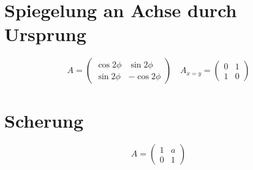 \documentclass{report}
\begin{document}
\section{Spiegelung an Achse durch Ursprung}
\begin{equation}A=\left(\begin{matrix}\cos{2 \phi} & \sin{2 \phi} \\ \sin{2\phi} & -\cos{2\phi}\end{matrix}\right) \quad A_{x=y}=\left(\begin{matrix}0 & 1\\1 & 0\end{matrix}\right)\end{equation}
\section{Scherung}
\begin{equation}A=\left(\begin{matrix}1 & a \\ 0 & 1\end{matrix}\right)\end{equation}
\end{document}
